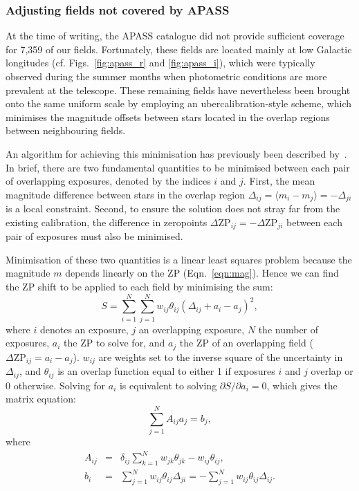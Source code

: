 \documentclass[a4paper,useAMS,usenatbib]{mn2e}
\begin{document}
\subsubsection{Adjusting fields not covered by APASS}

At the time of writing, the APASS catalogue did not provide 
sufficient coverage for 7,359 of our fields.
Fortunately, these fields are located mainly 
at low Galactic longitudes (cf. Figs.~\ref{fig:apass_r} and \ref{fig:apass_i}),
which were typically observed during the summer months
when photometric conditions are more prevalent at the telescope.
These remaining fields have nevertheless 
been brought onto the same uniform scale 
by employing an ubercalibration-style scheme,
which minimises the magnitude offsets between stars
located in the overlap regions between neighbouring fields.

An algorithm for achieving this minimisation
has previously been described by~\citet{Glazebrook1994}.
In brief, there are two fundamental quantities to be
minimised between each pair of overlapping exposures, 
denoted by the indices $i$ and $j$. 
First, the mean magnitude difference between stars in the overlap
region $\Delta_{ij}=\langle m_i-m_j\rangle=-\Delta_{ji}$ is a local
constraint. 
Second, to ensure the solution does not stray far 
from the existing calibration, 
the difference in zeropoints 
$\Delta\mathrm{ZP}_{ij}=-\Delta\mathrm{ZP}_{ji}$ 
between each pair of exposures must also be minimised.

Minimisation of these two quantities is a linear least squares problem 
because the magnitude $m$ depends linearly on the ZP (Eqn.~\ref{eqn:mag}).
Hence we can find the ZP shift to be applied to each field 
by minimising the sum:
\begin{equation}
   S = \sum_{i=1}^N \sum_{j=1}^N w_{ij} \theta_{ij} (\Delta_{ij} + a_i - a_j)^2,
   \label{eqn:chi2}
\end{equation}
where $i$ denotes an exposure, 
$j$ an overlapping exposure, 
$N$ the number of exposures,
$a_i$ the ZP to solve for,
and $a_j$ the ZP of an overlapping field ($\Delta\mathrm{ZP}_{ij}=a_i-a_j$). 
$w_{ij}$ are weights set to the inverse square of the uncertainty in $\Delta_{ij}$,
and $\theta_{ij}$ is an overlap function 
equal to either 1 if exposures $i$ and $j$ overlap or 0 otherwise. 
Solving for $a_i$ is equivalent to solving $\partial
S/\partial a_i=0$, which gives the matrix equation:
\begin{equation}
   \sum_{j=1}^N A_{ij} a_j = b_j,
   \label{eqn:matrix}
\end{equation}
where 
\begin{eqnarray}
   A_{ij} &=& \delta_{ij} \sum_{k=1}^N w_{jk}\theta_{jk} - w_{ij} \theta_{ij},\label{eqn:aij}\\
   b_i &=& \sum_{j=1}^N w_{ij} \theta_{ij}\Delta_{ji} = -\sum_{j=1}^N w_{ij} \theta_{ij}\Delta_{ij}.\label{eqn:bi}
\end{eqnarray}
\end{document}
